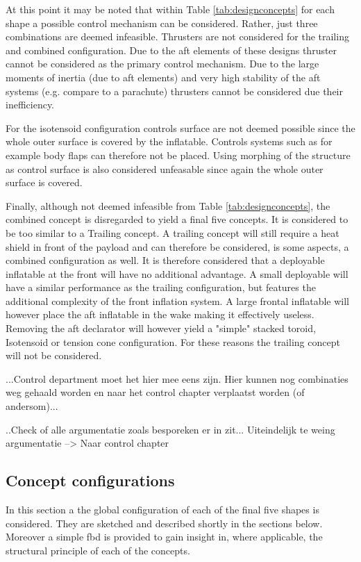 At this point it may be noted that within Table \ref{tab:designconcepts} for each shape a possible control mechanism can be considered. Rather, just three combinations are deemed infeasible. Thrusters are not considered for the trailing and combined configuration. Due to the aft elements of these designs thruster cannot be considered as the primary control mechanism. Due to the large moments of inertia (due to aft elements) and very high stability of the aft systems (e.g. compare to a parachute) thrusters cannot be considered due their inefficiency. 

For the isotensoid configuration controls surface are not deemed possible since the whole outer surface is covered by the inflatable. Controls systems such as for example body flaps can therefore not be placed. Using morphing of the structure as control surface is also considered unfeasable since again the whole outer surface is covered. 

Finally, although not deemed infeasible from Table \ref{tab:designconcepts}, the combined concept is disregarded to yield a final five concepts. It is considered to be too similar to a Trailing concept. A trailing concept will still require a heat shield in front of the payload and can therefore be considered, is some aspects, a combined configuration as well. It is therefore considered that a deployable inflatable at the front will have no additional advantage. A small deployable will have a similar performance as the trailing configuration, but features the additional complexity of the front inflation system. A large frontal inflatable will however place the aft inflatable in the wake making it effectively useless. Removing the aft declarator will however yield a "simple" stacked toroid, Isotensoid or tension cone configuration. For these reasons the trailing concept will not be considered. 


...Control department moet het hier mee eens zijn. Hier kunnen nog combinaties weg gehaald worden en naar het control chapter verplaatst worden (of andersom)... 

..Check of alle argumentatie zoals besporeken er in zit... Uiteindelijk te weing argumentatie --> Naar control chapter

\subsection{Concept configurations} \label{sec:conf}

In this section a the global configuration of each of the final five shapes is considered. They are sketched and described shortly in the sections below. Moreover a simple \gls{fbd} is provided to gain insight in, where applicable, the structural principle of each of the concepts.

